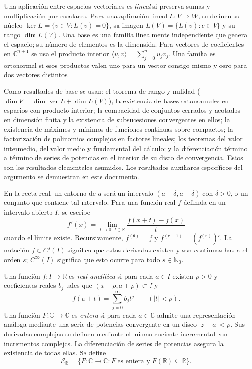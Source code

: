 \documentclass[11pt,a4paper]{article}
\numberwithin{equation}{section}
\theoremstyle{definition}
\theoremstyle{remark}
\newcommand{\R}{\mathbb R}
\newcommand{\C}{\mathbb C}
\newcommand{\Nn}{\mathbb N_0}
\newcommand{\ER}{\mathcal E_{\R}}
\begin{document}
Una aplicación entre espacios vectoriales es \emph{lineal} si preserva sumas y multiplicación por escalares. Para una aplicación lineal $L:V\to W$, se definen su núcleo $\ker L=\{v\in V:L(v)=0\}$, su imagen $L(V)=\{L(v):v\in V\}$ y su rango $\dim L(V)$. Una base es una familia linealmente independiente que genera el espacio; su número de elementos es la dimensión. Para vectores de coeficientes en $\C^{n+1}$ se usa el producto interior $\langle u,v\rangle=\sum_{j=0}^n u_j\overline{v_j}$. Una familia es ortonormal si esos productos valen uno para un vector consigo mismo y cero para dos vectores distintos.

Como resultados de base se usan: el teorema de rango y nulidad ($\dim V=\dim\ker L+\dim L(V)$); la existencia de bases ortonormales en espacios con producto interior; la compacidad de conjuntos cerrados y acotados en dimensión finita y la existencia de subsucesiones convergentes en ellos; la existencia de máximos y mínimos de funciones continuas sobre compactos; la factorización de polinomios complejos en factores lineales; los teoremas del valor intermedio, del valor medio y fundamental del cálculo; y la diferenciación término a término de series de potencias en el interior de su disco de convergencia. Estos son los resultados elementales asumidos. Los resultados auxiliares específicos del argumento se demuestran en este documento.

En la recta real, un entorno de $a$ será un intervalo $(a-\delta,a+\delta)$ con $\delta>0$, o un conjunto que contiene tal intervalo. Para una función real $f$ definida en un intervalo abierto $I$, se escribe
\[
f'(x)=\lim_{t\to0,\ t\in\R}\frac{f(x+t)-f(x)}{t}
\]
cuando el límite existe. Recursivamente, $f^{(0)}=f$ y $f^{(r+1)}=(f^{(r)})'$. La notación $f\in C^s(I)$ significa que estas derivadas existen y son continuas hasta el orden $s$; $C^\infty(I)$ significa que esto ocurre para todo $s\in\Nn$.

Una función $f:I\to\R$ es \emph{real analítica} si para cada $a\in I$ existen $\rho>0$ y coeficientes reales $b_j$ tales que $(a-\rho,a+\rho)\subset I$ y
\[
f(a+t)=\sum_{j=0}^{\infty}b_jt^j\qquad(|t|<\rho).
\]
Una función $F:\C\to\C$ es \emph{entera} si para cada $a\in\C$ admite una representación análoga mediante una serie de potencias convergente en un disco $|z-a|<\rho$. Sus derivadas complejas se definen mediante el mismo cociente incremental con incrementos complejos. La diferenciación de series de potencias asegura la existencia de todas ellas. Se define
\[
\ER=\{F:\C\to\C:F\text{ es entera y }F(\R)\subseteq\R\}.
\]
\end{document}
